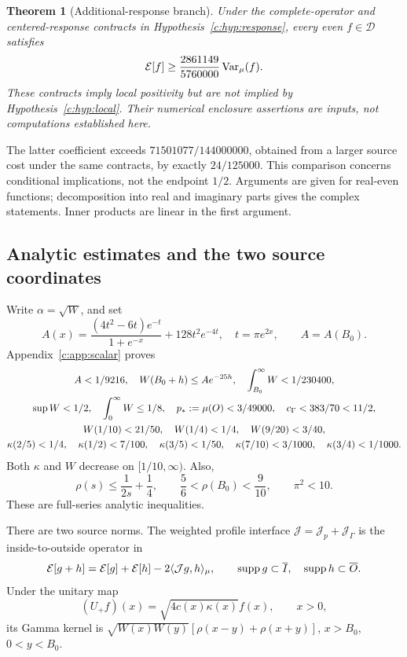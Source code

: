 \documentclass[11pt,a4paper]{article}
\numberwithin{equation}{section}
\newtheorem{theorem}{Theorem}[section]
\theoremstyle{definition}\newtheorem{definition}[theorem]{Definition}
\theoremstyle{remark}\newtheorem{remark}[theorem]{Remark}
\newcommand{\E}{\mathcal E}\newcommand{\D}{\mathcal D}
\newcommand{\ip}[2]{\langle#1,#2\rangle}\newcommand{\norm}[1]{\lVert#1\rVert}\newcommand{\abs}[1]{\lvert#1\rvert}
\begin{document}
\begin{theorem}[Additional-response branch]\label{c:thm:conditionalglobal}
Under the complete-operator and centered-response contracts in Hypothesis~\ref{c:hyp:response}, every even $f\in\D$ satisfies
\begin{equation}\label{c:eq:newglobal}
 \E[f]\ge\frac{2861149}{5760000}\Var_\mu(f).
\end{equation}
These contracts imply local positivity but are not implied by Hypothesis~\ref{c:hyp:local}. Their numerical enclosure assertions are inputs, not computations established here.
\end{theorem}
The latter coefficient exceeds $71501077/144000000$, obtained from a larger source cost under the same contracts, by exactly $24/125000$. This comparison concerns conditional implications, not the endpoint $1/2$. Arguments are given for real-even functions; decomposition into real and imaginary parts gives the complex statements. Inner products are linear in the first argument. 


\subsection{Analytic estimates and the two source coordinates}\label{c:sec:estimates}
Write $\alpha=\sqrt W$, and set
\[
 A(x)=\frac{(4t^2-6t)e^{-t}}{1+e^{-x}}+128t^2e^{-4t},
 \quad t=\pi e^{2x},\qquad A=A({B_0}).
\]
Appendix~\ref{c:app:scalar} proves
\begin{gather}
 A<1/9216,\quad W({B_0}+h)\le Ae^{-25h},\quad
 \int_{B_0}^\infty W<1/230400,\label{c:eq:envelope}\\
 \sup W<1/2,\quad \int_0^\infty W\le1/8,\quad
 p_*:=\mu(O)<3/49000,\quad c_\Gamma<383/70<11/2,\label{c:eq:basiccaps}\\
 W(1/10)<21/50,\quad W(1/4)<1/4,\quad W(9/20)<3/40,\label{c:eq:pointW}\\
 \kappa(2/5)<1/4,\quad \kappa(1/2)<7/100,\quad
 \kappa(3/5)<1/50,\quad \kappa(7/10)<3/1000,\quad
 \kappa(3/4)<1/1000.\label{c:eq:pointkappa}
\end{gather}
Both $\kappa$ and $W$ decrease on $[1/10,\infty)$. Also,
\begin{equation}\label{c:eq:rhoelementary}
 \rho(s)\le\frac1{2s}+\frac14,\qquad
 \frac56<\rho({B_0})<\frac9{10},\qquad \pi^2<10.
\end{equation}
These are full-series analytic inequalities.

There are two source norms. The weighted profile interface $\mathcal J=\mathcal J_p+\mathcal J_\Gamma$ is the inside-to-outside operator in
\begin{equation}\label{c:eq:energycross}
 \E[g+h]=\E[g]+\E[h]-2\ip{\mathcal Jg}{h}_\mu,
 \qquad \supp g\subset\overline I,\quad\supp h\subset\overline O.
\end{equation}
Under the unitary map
\begin{equation}\label{c:eq:foldU}
 (U_+ f)(x)=\sqrt{4c(x)\kappa(x)}f(x),\qquad x>0,
\end{equation}
its Gamma kernel is $\sqrt{W(x)W(y)}[\rho(x-y)+\rho(x+y)]$, $x>{B_0}$, $0<y<{B_0}$.
\end{document}
